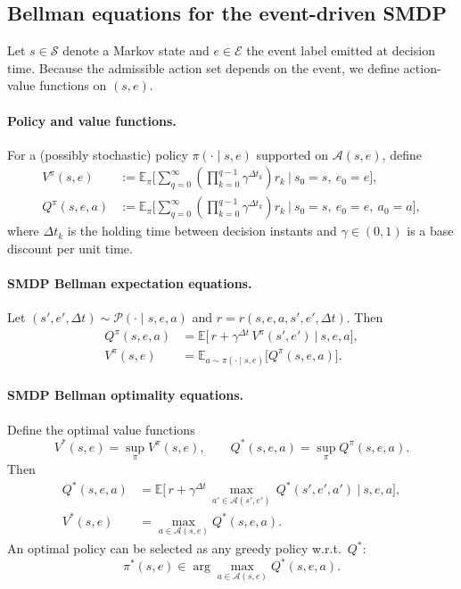 \documentclass[preprint, 3p, review, 12pt]{elsarticle}
\begin{document}
\subsection{Bellman equations for the event-driven SMDP}
Let $s\in\mathcal{S}$ denote a Markov state and $e\in\mathcal{E}$ the event label emitted at decision time.
Because the admissible action set depends on the event, we define action-value functions on $(s,e)$.

\paragraph{Policy and value functions.}
For a (possibly stochastic) policy $\pi(\cdot\mid s,e)$ supported on $\mathcal{A}(s,e)$, define
\begin{align}
V^{\pi}(s,e)
&:= \mathbb{E}_{\pi}\Bigg[\sum_{q=0}^{\infty}
\left(\prod_{k=0}^{q-1}\gamma^{\Delta t_k}\right) r_k \ \Bigg| \ s_0=s,\ e_0=e\Bigg],
\label{eq:V_def}
\\
Q^{\pi}(s,e,a)
&:= \mathbb{E}_{\pi}\Bigg[\sum_{q=0}^{\infty}
\left(\prod_{k=0}^{q-1}\gamma^{\Delta t_k}\right) r_k \ \Bigg| \ s_0=s,\ e_0=e,\ a_0=a\Bigg],
\label{eq:Q_def}
\end{align}
where $\Delta t_k$ is the holding time between decision instants and $\gamma\in(0,1)$ is a base discount per unit time.

\paragraph{SMDP Bellman expectation equations.}
Let $(s',e',\Delta t)\sim \mathcal{P}(\cdot\mid s,e,a)$ and $r=r(s,e,a,s',e',\Delta t)$.
Then
\begin{align}
Q^{\pi}(s,e,a)
&=\mathbb{E}\Big[\, r + \gamma^{\Delta t}\, V^{\pi}(s',e') \ \Big|\ s,e,a\Big],
\label{eq:bellman_Q}
\\
V^{\pi}(s,e)
&=\mathbb{E}_{a\sim \pi(\cdot\mid s,e)}\big[Q^{\pi}(s,e,a)\big].
\label{eq:bellman_V}
\end{align}

\paragraph{SMDP Bellman optimality equations.}
Define the optimal value functions
\[
V^*(s,e)=\sup_{\pi}V^{\pi}(s,e),
\qquad
Q^*(s,e,a)=\sup_{\pi}Q^{\pi}(s,e,a).
\]
Then
\begin{align}
Q^*(s,e,a)
&=\mathbb{E}\Big[\, r + \gamma^{\Delta t}\, \max_{a'\in\mathcal{A}(s',e')}\, Q^*(s',e',a') \ \Big|\ s,e,a\Big],
\label{eq:bellman_opt_Q}
\\
V^*(s,e)
&=\max_{a\in\mathcal{A}(s,e)} Q^*(s,e,a).
\label{eq:bellman_opt_V}
\end{align}
An optimal policy can be selected as any greedy policy w.r.t.\ $Q^*$:
\[
\pi^*(s,e)\in \arg\max_{a\in\mathcal{A}(s,e)} Q^*(s,e,a).
\]
\end{document}
